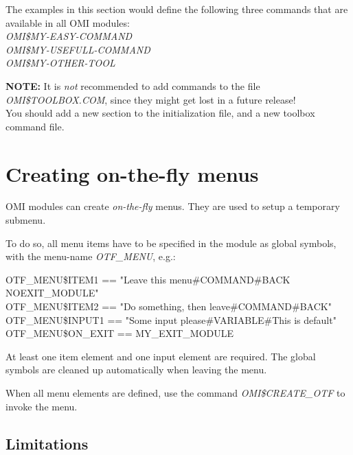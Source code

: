 \documentclass[a4paper]{book}
\newcommand{\vs}{\vspace{3mm}}
\renewcommand{\indent}{\hspace*{5mm}}
\begin{document}
\vs

The examples in this section would define the following three commands that 
are available in all OMI modules: \\
\indent\textsl{OMI{\$}MY-EASY-COMMAND} \\
\indent\textsl{OMI{\$}MY-USEFULL-COMMAND} \\
\indent\textsl{OMI{\$}MY-OTHER-TOOL}

\vs

\hspace{-8mm}\textbf{NOTE:} It is \textit{not} recommended to add commands to the file 
\textsl{OMI{\$}TOOLBOX.COM}, since they might get lost in a future release! \\
You should add a new section to the initialization file, and a new toolbox 
command file.

\chapter{Creating on-the-fly menus}
\label{sec:mylabel2}


OMI modules can create \textit{on-the-fly} menus. They are used to setup a temporary submenu.

To do so, all menu items have to be specified in the module as 
global symbols, with the menu-name \textsl{OTF{\_}MENU}, e.g.: \\
\begin{small}
\begin{textsf}
\indent{\$} OTF{\_}MENU{\$}ITEM1 == "Leave this menu{\#}COMMAND{\#}BACK NOEXIT{\_}MODULE" \\
\indent{\$} OTF{\_}MENU{\$}ITEM2 == "Do something, then leave{\#}COMMAND{\#}BACK" \\
\indent{\$} OTF{\_}MENU{\$}INPUT1 == "Some input please{\#}VARIABLE{\#}This is default" \\
\indent{\$} OTF{\_}MENU{\$}ON{\_}EXIT == MY{\_}EXIT{\_}MODULE \\
\end{textsf}
\end{small}

\vs

At least one item element and one input element are required.
The global symbols are cleaned up automatically when leaving the menu.

When all menu elements are defined, use the command \textsl{OMI{\$}CREATE{\_}OTF} to 
invoke the menu.

\section{Limitations}
\label{subsec:limitationsnu}
\end{document}
